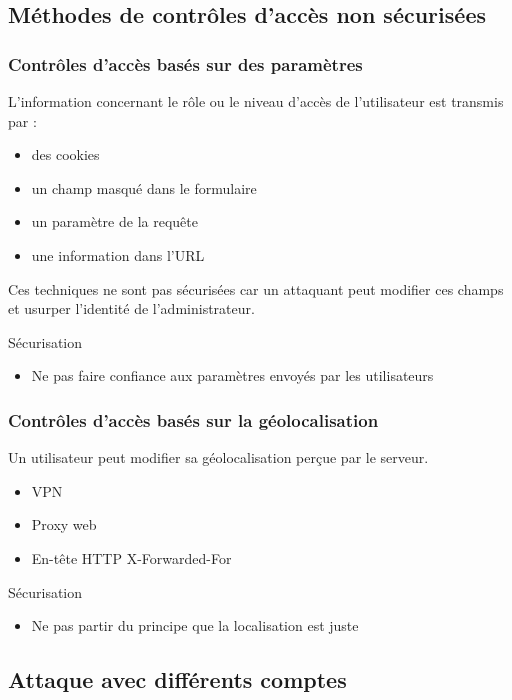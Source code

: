 \documentclass{beamer}
\begin{document}
\subsection{Méthodes de contrôles d'accès non sécurisées}

\begin{frame}
  \frametitle{Contrôles d'accès basés sur des paramètres}
  L'information concernant le rôle ou le niveau d'accès de l'utilisateur est transmis par :
  \begin{itemize}
    \item des cookies
    \item un champ masqué dans le formulaire
    \item un paramètre de la requête
    \item une information dans l'URL
  \end{itemize}
  Ces techniques ne sont pas sécurisées car un attaquant peut modifier ces champs et usurper l'identité de l'administrateur.
  \begin{exampleblock}{Sécurisation}
    \begin{itemize}
      \item Ne pas faire confiance aux paramètres envoyés par les utilisateurs
    \end{itemize}
  \end{exampleblock}
\end{frame}


\begin{frame}
  \frametitle{Contrôles d'accès basés sur la géolocalisation}
  Un utilisateur peut modifier sa géolocalisation perçue par le serveur.
  \begin{itemize}
    \item VPN
    \item Proxy web
    \item En-tête HTTP X-Forwarded-For
  \end{itemize}
  \begin{exampleblock}{Sécurisation}
    \begin{itemize}
      \item Ne pas partir du principe que la localisation est juste
    \end{itemize}
  \end{exampleblock}
\end{frame}

\subsection{Attaque avec différents comptes}
\end{document}

